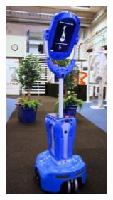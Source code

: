 \documentclass[runningheads,a4paper,12pt]{report}
\begin{document}
\begin{figure}
	\centering

  \begin{subfigure}{.25\textwidth}
  	\centering
  	\includegraphics[width=\linewidth]{./images/1_giraff}
  	\caption{}
  	\label{fig:giraff}
  \end{subfigure} 
  \hfill  
  \begin{subfigure}{.3\textwidth}

\end{subfigure}
\end{figure}
\end{document}
